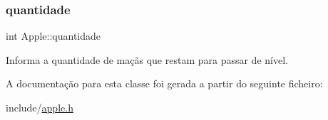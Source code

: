 \mbox{\label{classApple_a6f605e3860374c5e0ec55123ee4d4200}} 
\subsubsection{\texorpdfstring{quantidade}{quantidade}}
{\footnotesize\ttfamily int Apple\+::quantidade\hspace{0.3cm}{\ttfamily [private]}}



Informa a quantidade de maçãs que restam para passar de nível. 



A documentação para esta classe foi gerada a partir do seguinte ficheiro\+:\begin{DoxyCompactItemize}
\item 
include/\hyperlink{apple_8h}{apple.\+h}\end{DoxyCompactItemize}
